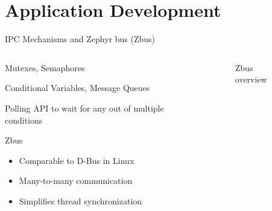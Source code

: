 \documentclass[10pt, aspectratio=169]{beamer}
\begin{document}
\section{Application Development}
\begin{frame}[fragile]{IPC Mechanisms and Zephyr bus (Zbus)}
  \begin{columns}
    \begin{column}{0.6\textwidth}
      Mutexes, Semaphores

      Conditional Variables, Message Queues

      Polling API to wait for any out of multiple conditions

    \begin{block}{Zbus}
      \begin{itemize}
        \item Comparable to D-Bus in Linux
        \item Many-to-many communication
        \item Simplifies thread synchronization
      \end{itemize}
    \end{block}
    \end{column}
    \begin{column}{0.4\textwidth}
      \begin{figure}
       
        \caption*{Zbus overview\footnotemark}
      \end{figure}
    \end{column}
  \end{columns}
\end{frame}
\end{document}
